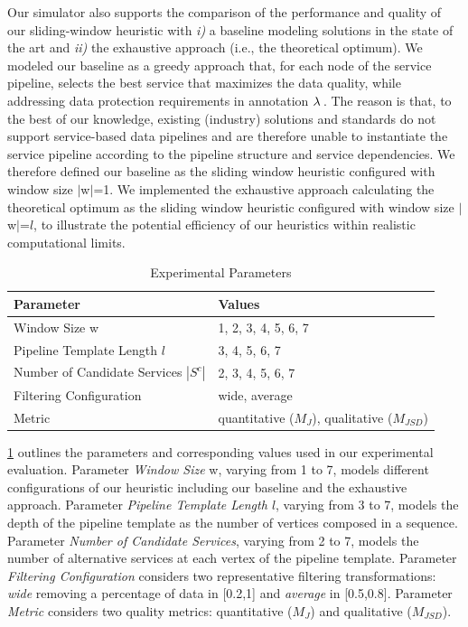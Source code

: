     Our simulator also supports the comparison of the performance and quality of our sliding-window heuristic with \emph{i)} a baseline modeling solutions in the state of the art and \emph{ii)} the exhaustive approach (i.e., the theoretical optimum). We modeled our baseline as a greedy approach that, for each node of the service pipeline, selects the best service that maximizes the data quality, while addressing data protection requirements in annotation $\lambda\,$. The reason is that, to the best of our knowledge, existing (industry) solutions and standards do not support service-based data pipelines and are therefore unable to instantiate the service pipeline according to the pipeline structure and service dependencies. We therefore defined our baseline as the sliding window heuristic configured with window size $|$w$|$=1.
    We implemented the exhaustive approach calculating the theoretical optimum as the sliding window heuristic configured with window size $|$w$|$=$l$, to illustrate the potential efficiency of our heuristics within realistic computational limits.

    \begin{table}[!t]
      \caption{Experimental Parameters}
      \label{tab:parameters}
      \centering
      {\color{OurColor2}
      \begin{tabular}{l|l}
        \textbf{Parameter}                  & \textbf{Values}  \\
        \hline
        Window Size \textbar{}w\textbar{} & 1, 2, 3, 4, 5, 6, 7 \\
        Pipeline Template Length $l$        & 3, 4, 5, 6, 7 \\
        Number of Candidate Services $|S^c|$ & 2, 3, 4, 5, 6, 7 \\
        Filtering Configuration             & wide, average    \\
        Metric                             & quantitative ($M_J$), qualitative ($M_{JSD}$) \\
      \end{tabular}
      }
    \end{table}

    {\color{OurColor2}
    \cref{tab:parameters} outlines the parameters and corresponding values used in our experimental evaluation. Parameter \emph{Window Size} \textbar{}w\textbar{}, varying from 1 to 7, models different configurations of our heuristic including our baseline and the exhaustive approach. Parameter \emph{Pipeline Template Length $l$}, varying from 3 to 7, models the depth of the pipeline template as the number of vertices composed in a sequence. Parameter \emph{Number of Candidate Services}, varying from 2 to 7, models the number of alternative services at each vertex of the pipeline template. Parameter \emph{Filtering Configuration} considers two representative filtering transformations: \textit{wide} removing a percentage of data in [0.2,1] and \textit{average} in [0.5,0.8]. Parameter \emph{Metric} considers two quality metrics: quantitative ($M_J$) and qualitative ($M_{JSD}$).}


